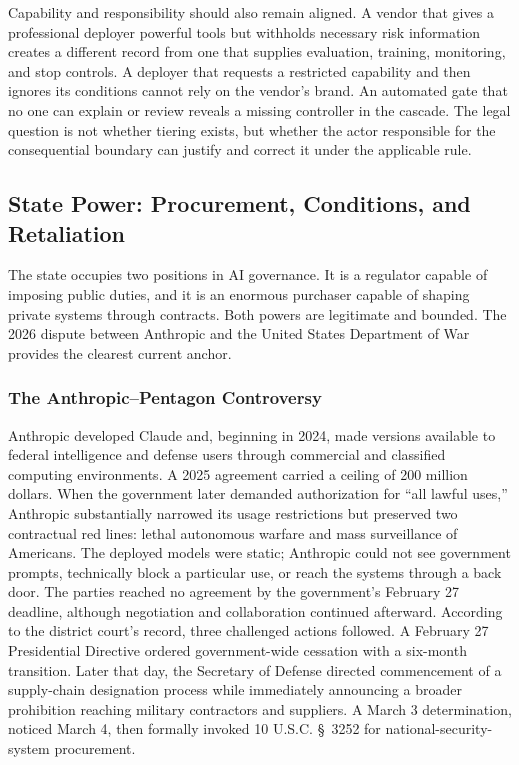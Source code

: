 Capability and responsibility should also remain aligned. A vendor that gives a professional deployer powerful tools but withholds necessary risk information creates a different record from one that supplies evaluation, training, monitoring, and stop controls. A deployer that requests a restricted capability and then ignores its conditions cannot rely on the vendor's brand. An automated gate that no one can explain or review reveals a missing controller in the cascade. The legal question is not whether tiering exists, but whether the actor responsible for the consequential boundary can justify and correct it under the applicable rule.

\subsection{State Power: Procurement, Conditions, and Retaliation}

The state occupies two positions in AI governance. It is a regulator capable of imposing public duties, and it is an enormous purchaser capable of shaping private systems through contracts. Both powers are legitimate and bounded. The 2026 dispute between Anthropic and the United States Department of War provides the clearest current anchor.

\subsubsection{The Anthropic--Pentagon Controversy}

Anthropic developed Claude and, beginning in 2024, made versions available to federal intelligence and defense users through commercial and classified computing environments. A 2025 agreement carried a ceiling of 200 million dollars. When the government later demanded authorization for ``all lawful uses,'' Anthropic substantially narrowed its usage restrictions but preserved two contractual red lines: lethal autonomous warfare and mass surveillance of Americans. The deployed models were static; Anthropic could not see government prompts, technically block a particular use, or reach the systems through a back door. The parties reached no agreement by the government's February 27 deadline, although negotiation and collaboration continued afterward. According to the district court's record, three challenged actions followed. A February 27 Presidential Directive ordered government-wide cessation with a six-month transition. Later that day, the Secretary of Defense directed commencement of a supply-chain designation process while immediately announcing a broader prohibition reaching military contractors and suppliers. A March 3 determination, noticed March 4, then formally invoked 10 U.S.C. \S~3252 for national-security-system procurement.

